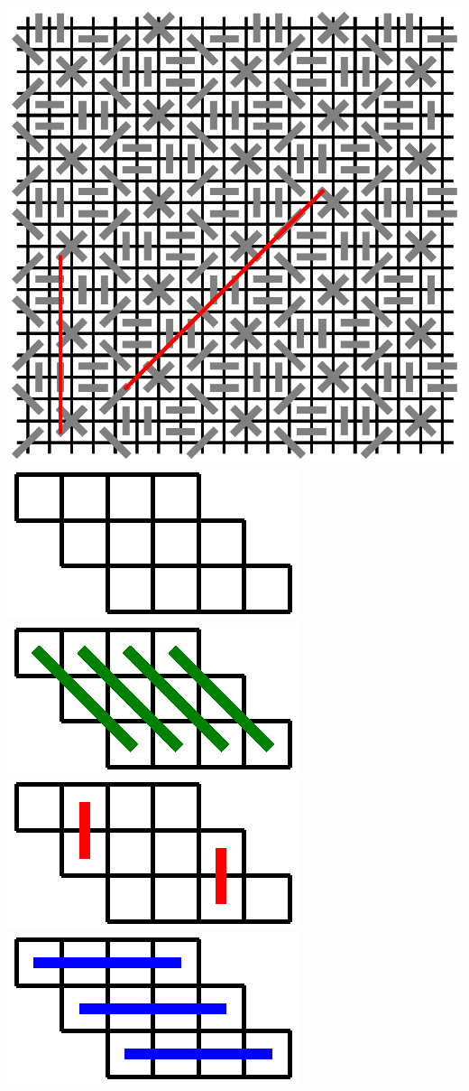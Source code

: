 \documentclass{article}
\begin{document}
\includegraphics{m-n-9.eps}
\\
\includegraphics{m-n-8-little.eps}
\\
\includegraphics{8-rules1.eps}
\includegraphics{8-rules2.eps}
\includegraphics{8-rules3.eps}
\end{document}

